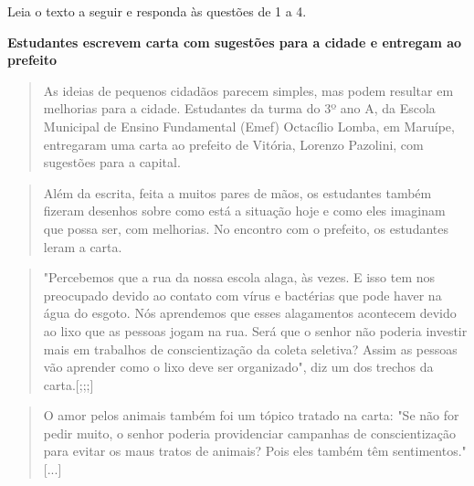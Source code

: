 
Leia o texto a seguir e responda às questões de 1 a 4.

\textbf{Estudantes escrevem carta com sugestões para a cidade e entregam
ao prefeito}

\begin{quote}
As ideias de pequenos cidadãos parecem simples, mas podem resultar em
melhorias para a cidade. Estudantes da turma do 3º ano A, da Escola
Municipal de Ensino Fundamental (Emef) Octacílio Lomba, em Maruípe,
entregaram uma carta ao prefeito de Vitória, Lorenzo Pazolini, com
sugestões para a capital.
\end{quote}

\begin{quote}
Além da escrita, feita a muitos pares de mãos, os estudantes também
fizeram desenhos sobre como está a situação hoje e como eles imaginam
que possa ser, com melhorias. No encontro com o prefeito, os estudantes
leram a carta.
\end{quote}

\begin{quote}
"Percebemos que a rua da nossa escola alaga, às vezes. E isso tem nos
preocupado devido ao contato com vírus e bactérias que pode haver na
água do esgoto. Nós aprendemos que esses alagamentos acontecem devido ao
lixo que as pessoas jogam na rua. Será que o senhor não poderia investir
mais em trabalhos de conscientização da coleta seletiva? Assim as
pessoas vão aprender como o lixo deve ser organizado", diz um dos
trechos da carta.{[};;;{]}
\end{quote}

\begin{quote}
O amor pelos animais também foi um tópico tratado na carta: "Se não for
pedir muito, o senhor poderia providenciar campanhas de conscientização
para evitar os maus tratos de animais? Pois eles também têm
sentimentos." {[}...{]}
\end{quote}

